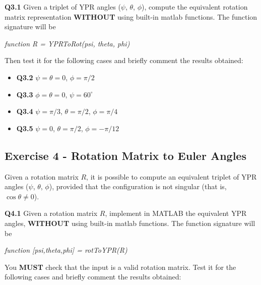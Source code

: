 \textbf{Q3.1} Given a triplet of YPR angles ($\psi$, $\theta$, $\phi$), compute the equivalent rotation matrix representation \textbf{WITHOUT} using built-in matlab functions. The function signature will be


\begin{center}\textit{function R = YPRToRot(psi, theta, phi)}\end{center}


Then test it for the following cases and briefly comment the results obtained:


\begin{itemize}
    \item \textbf{Q3.2}\hspace{10mm} $\psi=\theta=0$, $\phi=\pi/2$
    \item \textbf{Q3.3}\hspace{10mm} $\phi=\theta=0$, $\psi=60^\circ$
    \item \textbf{Q3.4}\hspace{10mm} $\psi=\pi/3$, $\theta=\pi/2$, $\phi=\pi/4$
    \item \textbf{Q3.5}\hspace{10mm} $\psi=0$, $\theta=\pi/2$, $\phi=-\pi/12$
\end{itemize}

\subsection{Exercise 4 - Rotation Matrix to Euler Angles}
Given a rotation matrix \begin{math}R\end{math}, it is possible to compute an equivalent triplet of YPR angles ($\psi$, $\theta$, $\phi$), provided that the configuration is not singular (that is, $\cos{\theta} \ne 0$).
\newline

\textbf{Q4.1} Given a rotation matrix \begin{math}R\end{math}, implement in MATLAB the equivalent YPR angles, \textbf{WITHOUT} using built-in matlab functions. The function signature will be


\begin{center}\textit{function [psi,theta,phi] = rotToYPR(R)}\end{center}


You \textbf{MUST} check that the input is a valid rotation matrix. Test it for the following cases and briefly comment the results obtained:



